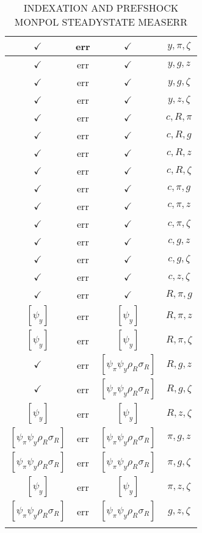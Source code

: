 \documentclass[a4paper,10pt]{article}
\begin{document}
\begin{longtable}{|c|c|c|c|}
\hline
$\checkmark$ & err & $\checkmark$ & ${y},{\pi},{\zeta}$ \\
\hline
$\checkmark$ & err & $\checkmark$ & ${y},{g},{z}$ \\
\hline
$\checkmark$ & err & $\checkmark$ & ${y},{g},{\zeta}$ \\
\hline
$\checkmark$ & err & $\checkmark$ & ${y},{z},{\zeta}$ \\
\hline
$\checkmark$ & err & $\checkmark$ & ${c},{R},{\pi}$ \\
\hline
$\checkmark$ & err & $\checkmark$ & ${c},{R},{g}$ \\
\hline
$\checkmark$ & err & $\checkmark$ & ${c},{R},{z}$ \\
\hline
$\checkmark$ & err & $\checkmark$ & ${c},{R},{\zeta}$ \\
\hline
$\checkmark$ & err & $\checkmark$ & ${c},{\pi},{g}$ \\
\hline
$\checkmark$ & err & $\checkmark$ & ${c},{\pi},{z}$ \\
\hline
$\checkmark$ & err & $\checkmark$ & ${c},{\pi},{\zeta}$ \\
\hline
$\checkmark$ & err & $\checkmark$ & ${c},{g},{z}$ \\
\hline
$\checkmark$ & err & $\checkmark$ & ${c},{g},{\zeta}$ \\
\hline
$\checkmark$ & err & $\checkmark$ & ${c},{z},{\zeta}$ \\
\hline
$\checkmark$ & err & $\checkmark$ & ${R},{\pi},{g}$ \\
\hline
$[\psi_y ]$ & err & $[\psi_y ]$ & ${R},{\pi},{z}$ \\
\hline
$[\psi_y ]$ & err & $[\psi_y ]$ & ${R},{\pi},{\zeta}$ \\
\hline
$\checkmark$ & err & $[\psi_\pi \psi_y \rho_R \sigma_R ]$ & ${R},{g},{z}$ \\
\hline
$\checkmark$ & err & $[\psi_\pi \psi_y \rho_R \sigma_R ]$ & ${R},{g},{\zeta}$ \\
\hline
$[\psi_y ]$ & err & $[\psi_y ]$ & ${R},{z},{\zeta}$ \\
\hline
$[\psi_\pi \psi_y \rho_R \sigma_R ]$ & err & $[\psi_\pi \psi_y \rho_R \sigma_R ]$ & ${\pi},{g},{z}$ \\
\hline
$[\psi_\pi \psi_y \rho_R \sigma_R ]$ & err & $[\psi_\pi \psi_y \rho_R \sigma_R ]$ & ${\pi},{g},{\zeta}$ \\
\hline
$[\psi_y ]$ & err & $[\psi_y ]$ & ${\pi},{z},{\zeta}$ \\
\hline
$[\psi_\pi \psi_y \rho_R \sigma_R ]$ & err & $[\psi_\pi \psi_y \rho_R \sigma_R ]$ & ${g},{z},{\zeta}$ \\
\hline
\caption{INDEXATION AND PREFSHOCK MONPOL STEADYSTATE MEASERR}
\label{table:MyTableLabel}
\end{longtable}
\end{document}
